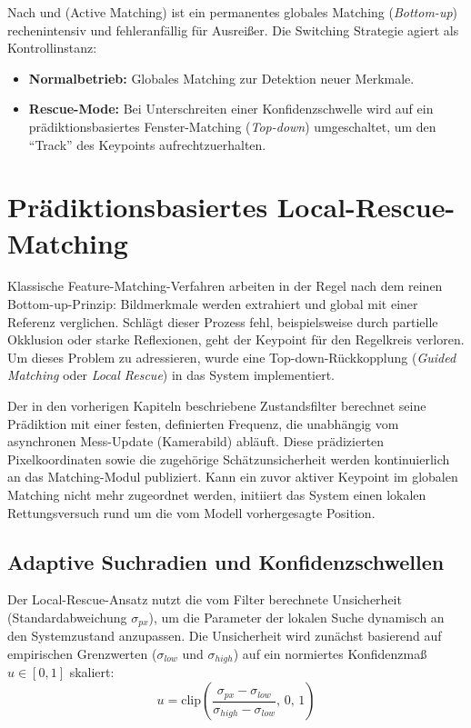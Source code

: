 \newpage
Nach \cite{hartley2003multiple} und \cite{chli2008active} (Active Matching) ist ein permanentes globales Matching (\textit{Bottom-up}) rechenintensiv und fehleranfällig für Ausreißer. Die Switching Strategie agiert als Kontrollinstanz:
\begin{itemize}
    \item \textbf{Normalbetrieb:} Globales Matching zur Detektion neuer Merkmale.
    \item \textbf{Rescue-Mode:} Bei Unterschreiten einer Konfidenzschwelle wird auf ein prädiktionsbasiertes Fenster-Matching (\textit{Top-down}) umgeschaltet, um den \enquote{Track} des Keypoints aufrechtzuerhalten.
\end{itemize}

\section{Prädiktionsbasiertes Local-Rescue-Matching}
\label{sec:LocalRescue}
Klassische Feature-Matching-Verfahren arbeiten in der Regel nach dem reinen Bottom-up-Prinzip: Bildmerkmale werden extrahiert und global mit einer Referenz verglichen. Schlägt dieser Prozess fehl, beispielsweise durch partielle Okklusion oder starke Reflexionen, geht der Keypoint für den Regelkreis verloren. Um dieses Problem zu adressieren, wurde eine Top-down-Rückkopplung (\textit{Guided Matching} oder \textit{Local Rescue}) in das System implementiert. 

Der in den vorherigen Kapiteln beschriebene Zustandsfilter berechnet seine Prädiktion mit einer festen, definierten Frequenz, die unabhängig vom asynchronen Mess-Update (Kamerabild) abläuft. Diese prädizierten Pixelkoordinaten sowie die zugehörige Schätzunsicherheit werden kontinuierlich an das Matching-Modul publiziert. Kann ein zuvor aktiver Keypoint im globalen Matching nicht mehr zugeordnet werden, initiiert das System einen lokalen Rettungsversuch rund um die vom Modell vorhergesagte Position.

\subsection{Adaptive Suchradien und Konfidenzschwellen}
Der Local-Rescue-Ansatz nutzt die vom Filter berechnete Unsicherheit (Standardabweichung $\sigma_{px}$), um die Parameter der lokalen Suche dynamisch an den Systemzustand anzupassen. Die Unsicherheit wird zunächst basierend auf empirischen Grenzwerten ($\sigma_{low}$ und $\sigma_{high}$) auf ein normiertes Konfidenzmaß $u \in [0, 1]$ skaliert:
\begin{equation}
    u = \text{clip}\left(\frac{\sigma_{px} - \sigma_{low}}{\sigma_{high} - \sigma_{low}}, \, 0, \, 1\right)
\end{equation}

